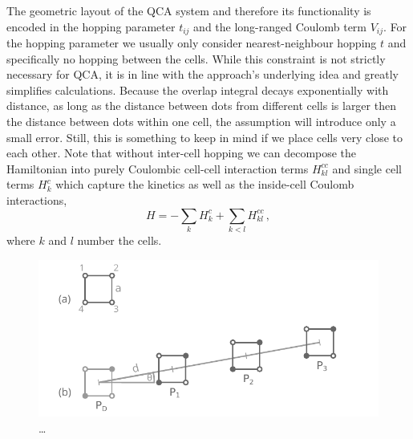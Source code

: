 The geometric layout of the QCA system and therefore its functionality is
encoded in the hopping parameter $t_{ij}$ and the long-ranged Coulomb term
$V_{ij}$. For the hopping parameter we usually only consider nearest-neighbour
hopping $t$ and specifically no hopping between the cells. While this constraint is
not strictly necessary for QCA, it is in line with the approach's underlying
idea and greatly simplifies calculations. Because the overlap integral decays
exponentially with distance, as long as the distance between dots from different
cells is larger then the distance between dots within one cell, the assumption will
introduce only a small error. Still, this is something to keep in mind if we
place cells very close to each other. Note that without inter-cell hopping we can
decompose the Hamiltonian into purely Coulombic cell-cell interaction terms
$H^{cc}_{kl}$ and single cell terms $H^c_k$ which capture the kinetics as well
as the inside-cell Coulomb interactions,
\begin{equation}
  \label{eq:H_cell}
  H = - \sum_k H^c_k + \sum_{k<l} H^{cc}_{kl} \, ,
\end{equation}
where $k$ and $l$ number the cells. 

\begin{figure}
  \center
  \includegraphics{short_wire}
  \caption{\ldots}
  \label{fig:short_wire}
\end{figure}

